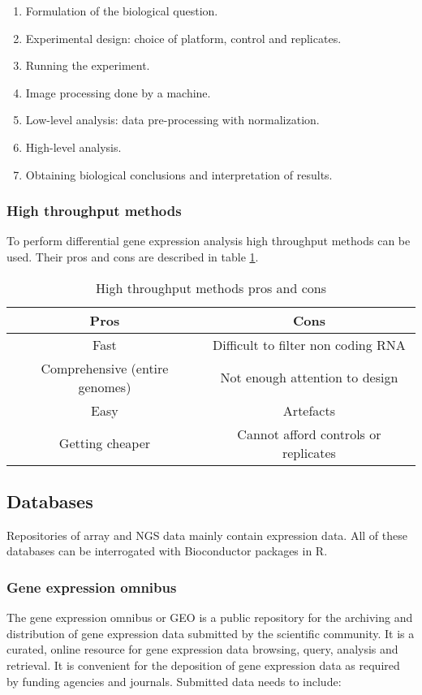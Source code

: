		\begin{multicols}{2}
			\begin{enumerate}
				\item Formulation of the biological question.
				\item Experimental design: choice of platform, control and replicates.
				\item Running the experiment.
				\item Image processing done by a machine.
				\item Low-level analysis: data pre-processing with normalization.
				\item High-level analysis.
				\item Obtaining biological conclusions and interpretation of results.
			\end{enumerate}
		\end{multicols}

		\subsubsection{High throughput methods}
		To perform differential gene expression analysis high throughput methods can be used.
		Their pros and cons are described in table \ref{tab:high-through-dge}.

		\begin{table}[H]
			\centering
			\begin{tabular}{|c|c|}
				\hline
				Pros & Cons\\
				\hline
				Fast & Difficult to filter non coding RNA\\
				Comprehensive (entire genomes) & Not enough attention to design\\
				Easy & Artefacts\\
				Getting cheaper & Cannot afford controls or replicates\\
				\hline
			\end{tabular}
			\caption{High throughput methods pros and cons}
			\label{tab:high-through-dge}
		\end{table}

	\subsection{Databases}
	Repositories of array and NGS data mainly contain expression data.
	All of these databases can be interrogated with Bioconductor packages in R.

		\subsubsection{Gene expression omnibus}
		The gene expression omnibus or GEO is a public repository for the archiving and distribution of gene expression data submitted by the scientific community.
		It is a curated, online resource for gene expression data browsing, query, analysis and retrieval.
		It is convenient for the deposition of gene expression data as required by funding agencies and journals.
		Submitted data needs to include:

